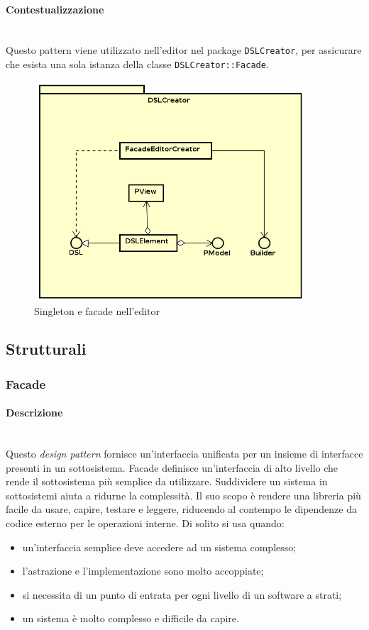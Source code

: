 \paragraph{Contestualizzazione}\mbox{} \\
Questo pattern viene utilizzato nell'editor nel package \texttt{DSLCreator}, per assicurare che esista una sola istanza della classe \texttt{DSLCreator::Facade}.
\begin{figure}[H]
\centering
\includegraphics[width=0.9\textwidth]{res/sections/frontend/facade_editor.png}
\caption{Singleton e facade nell'editor}
\label{fig:singleton_editor}
\end{figure}
\subsection{Strutturali}
\subsubsection{Facade}
\paragraph{Descrizione} \mbox{} \\
Questo \textit{design pattern} fornisce un'interfaccia unificata per un insieme di interfacce presenti in un sottosistema. Facade definisce un'interfaccia di alto livello che rende il sottosistema più semplice da utilizzare. Suddividere un sistema in sottosistemi aiuta a ridurne la complessità. Il suo scopo è rendere una libreria più facile da usare, capire, testare e leggere, riducendo al contempo le dipendenze da codice esterno per le operazioni interne. Di solito si usa quando:
\begin{itemize}
\item un'interfaccia semplice deve accedere ad un sistema complesso;
\item l'astrazione e l'implementazione sono molto accoppiate;
\item si necessita di un punto di entrata per ogni livello di un software a strati;
\item un sistema è molto complesso e difficile da capire.
\end{itemize}
